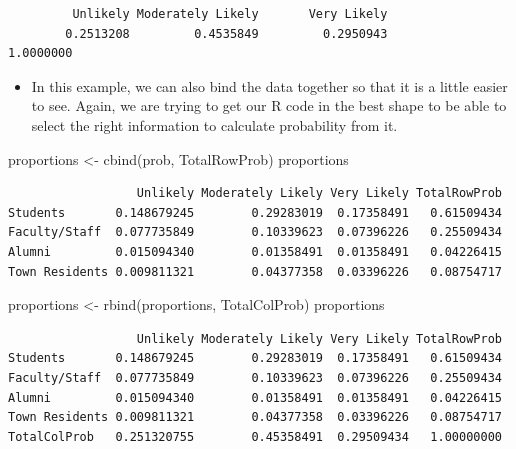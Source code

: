 \documentclass[
  letterpaper,
  DIV=11,
  numbers=noendperiod]{scrreprt}
\newenvironment{Shaded}{\begin{snugshade}}{\end{snugshade}}
\newcommand{\FunctionTok}[1]{\textcolor[rgb]{0.28,0.35,0.67}{#1}}
\newcommand{\NormalTok}[1]{\textcolor[rgb]{0.00,0.23,0.31}{#1}}
\newcommand{\OtherTok}[1]{\textcolor[rgb]{0.00,0.23,0.31}{#1}}
\providecommand{\tightlist}{%
  \setlength{\itemsep}{0pt}\setlength{\parskip}{0pt}}\usepackage{longtable,booktabs,array}
\begin{document}
\begin{verbatim}
         Unlikely Moderately Likely       Very Likely                   
        0.2513208         0.4535849         0.2950943         1.0000000 
\end{verbatim}

\begin{itemize}
\tightlist
\item
  In this example, we can also bind the data together so that it is a
  little easier to see. Again, we are trying to get our R code in the
  best shape to be able to select the right information to calculate
  probability from it.
\end{itemize}

\begin{Shaded}
\begin{Highlighting}[]
\NormalTok{proportions }\OtherTok{\textless{}{-}} \FunctionTok{cbind}\NormalTok{(prob, TotalRowProb)}
\NormalTok{proportions}
\end{Highlighting}
\end{Shaded}

\begin{verbatim}
                  Unlikely Moderately Likely Very Likely TotalRowProb
Students       0.148679245        0.29283019  0.17358491   0.61509434
Faculty/Staff  0.077735849        0.10339623  0.07396226   0.25509434
Alumni         0.015094340        0.01358491  0.01358491   0.04226415
Town Residents 0.009811321        0.04377358  0.03396226   0.08754717
\end{verbatim}

\begin{Shaded}
\begin{Highlighting}[]
\NormalTok{proportions }\OtherTok{\textless{}{-}} \FunctionTok{rbind}\NormalTok{(proportions, TotalColProb)}
\NormalTok{proportions}
\end{Highlighting}
\end{Shaded}

\begin{verbatim}
                  Unlikely Moderately Likely Very Likely TotalRowProb
Students       0.148679245        0.29283019  0.17358491   0.61509434
Faculty/Staff  0.077735849        0.10339623  0.07396226   0.25509434
Alumni         0.015094340        0.01358491  0.01358491   0.04226415
Town Residents 0.009811321        0.04377358  0.03396226   0.08754717
TotalColProb   0.251320755        0.45358491  0.29509434   1.00000000
\end{verbatim}
\end{document}
